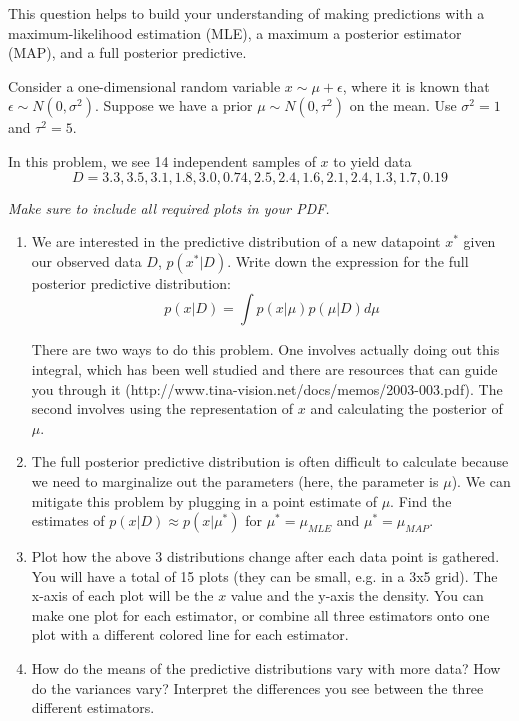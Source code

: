 \documentclass[submit]{harvardml}
\begin{document}
\begin{problem}

  This question helps to build your understanding of making
  predictions with a maximum-likelihood estimation (MLE), a maximum a
  posterior estimator (MAP), and a full posterior predictive.

  Consider a one-dimensional random variable $x \sim \mu + \epsilon$,
  where it is known that $\epsilon \sim N(0,\sigma^2)$.  Suppose we
  have a prior $\mu \sim N(0,\tau^2)$ on the mean.  Use $\sigma^2 = 1$
  and $\tau^2 = 5$.  

  In this problem, we see 14 independent samples of $x$ to yield data
  $$D = 3.3, 3.5, 3.1, 1.8, 3.0, 0.74, 2.5, 2.4, 1.6, 2.1, 2.4, 1.3, 1.7, 0.19$$
    
  \textit{Make sure to include all required plots in your PDF.}

\begin{enumerate}

\item We are interested in the predictive distribution of a new datapoint $x^*$ given our observed data $D$, $p(x^*|D)$.
  Write down the expression for the full posterior predictive distribution: $$p(x|D) = \int p(x|\mu)p(\mu|D) d\mu$$
  
  There are two ways to do this problem. One involves actually doing out this integral, which has been well studied and there are resources that can guide you through it (http://www.tina-vision.net/docs/memos/2003-003.pdf). The second involves using the representation of $x$ and calculating the posterior of $\mu$.
  
 \item The full posterior predictive distribution is often difficult to calculate because we need to marginalize out the parameters (here, the parameter is $\mu$). We can mitigate this problem by plugging in a point estimate of $\mu$. Find the estimates of $p(x|D) \approx p(x|\mu^*)$ for $\mu^* = \mu_{MLE}$ and $\mu^* = \mu_{MAP}$.
   
\item Plot how the above 3 distributions change after each data point is
  gathered.  You will have a total of 15 plots (they can be small,
  e.g. in a 3x5 grid).  The x-axis of each plot will be the $x$ value
  and the y-axis the density.  You can make one plot for each
  estimator, or combine all three estimators onto one plot with a
  different colored line for each estimator.
  
    
\item How do the means of the predictive distributions vary with more
  data?  How do the variances vary?  Interpret the differences you see
  between the three different estimators.
  

\end{enumerate}
\end{problem}
\end{document}
